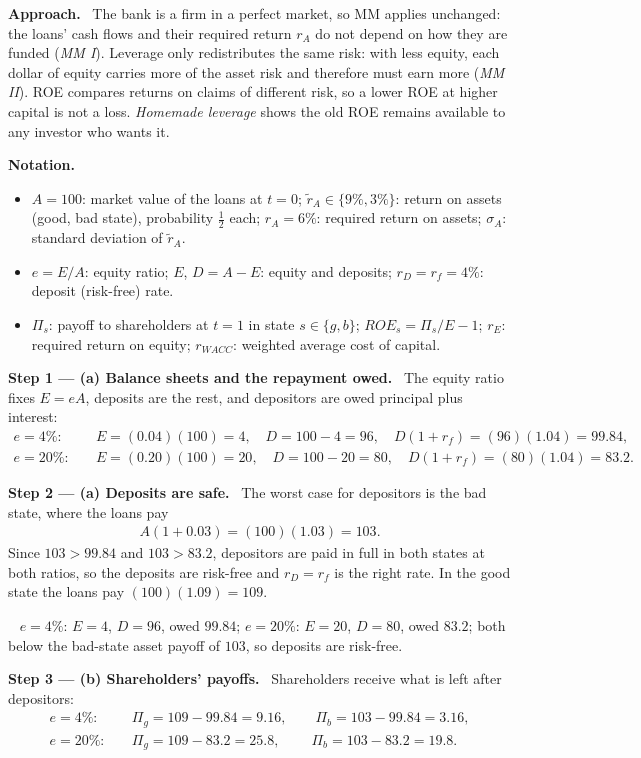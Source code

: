 \documentclass[11pt,a4paper]{article}
\numberwithin{equation}{section}
\newcommand{\notation}{\par\smallskip\noindent\textbf{Notation.}}
\newcommand{\step}[2]{\par\smallskip\noindent\textbf{Step #1 --- #2.}~}
\newcommand{\approach}{\par\smallskip\noindent\textbf{Approach.}~}
\newcommand{\answer}[1]{\par\smallskip\noindent\fbox{\textbf{Answer #1.}}~}
\begin{document}
\approach
The bank is a firm in a perfect market, so MM applies unchanged: the loans' cash flows and their
required return $r_A$ do not depend on how they are funded (\emph{MM I}). Leverage only
redistributes the same risk: with less equity, each dollar of equity carries more of the asset risk
and therefore must earn more (\emph{MM II}). ROE compares returns on claims of different risk, so a
lower ROE at higher capital is not a loss. \emph{Homemade leverage} shows the old ROE remains
available to any investor who wants it.

\notation
\begin{itemize}
  \item $A=100$: market value of the loans at $t=0$; $\tilde r_A\in\{9\%,3\%\}$: return on assets (good, bad state), probability $\tfrac12$ each; $r_A=6\%$: required return on assets; $\sigma_A$: standard deviation of $\tilde r_A$.
  \item $e=E/A$: equity ratio; $E$, $D=A-E$: equity and deposits; $r_D=r_f=4\%$: deposit (risk-free) rate.
  \item $\Pi_s$: payoff to shareholders at $t=1$ in state $s\in\{g,b\}$; $ROE_s=\Pi_s/E-1$; $r_E$: required return on equity; $r_{WACC}$: weighted average cost of capital.
\end{itemize}

\step{1}{(a) Balance sheets and the repayment owed} The equity ratio fixes $E=eA$, deposits are the
rest, and depositors are owed principal plus interest:
\begin{align}
  e=4\%:&\quad E=(0.04)(100)=4,\quad D=100-4=96,\quad D(1+r_f)=(96)(1.04)=99.84, \label{eq:16owed}\\
  e=20\%:&\quad E=(0.20)(100)=20,\quad D=100-20=80,\quad D(1+r_f)=(80)(1.04)=83.2. \nonumber
\end{align}

\step{2}{(a) Deposits are safe} The worst case for depositors is the bad state, where the loans pay
\begin{align}
  A(1+0.03)=(100)(1.03)=103. \label{eq:16Ab}
\end{align}
Since $103>99.84$ and $103>83.2$, depositors are paid in full in both states at both ratios, so the
deposits are risk-free and $r_D=r_f$ is the right rate. In the good state the loans pay
$(100)(1.09)=109$.
\answer{(a)} $e=4\%$: $E=4$, $D=96$, owed $99.84$; $e=20\%$: $E=20$, $D=80$, owed $83.2$; both below
the bad-state asset payoff of $103$, so deposits are risk-free.

\step{3}{(b) Shareholders' payoffs} Shareholders receive what is left after depositors:
\begin{align}
  e=4\%:&\quad \Pi_g=109-99.84=9.16,\qquad \Pi_b=103-99.84=3.16, \nonumber\\
  e=20\%:&\quad \Pi_g=109-83.2=25.8,\qquad\ \Pi_b=103-83.2=19.8. \nonumber
\end{align}
\end{document}
